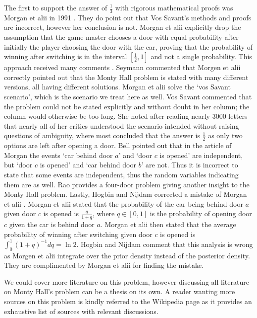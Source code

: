 \documentclass[a4paper]{report}
\theoremstyle{plain}
\theoremstyle{definition}
\theoremstyle{remark}
\numberwithin{equation}{chapter}
\DeclareMathOperator{\1}{\mathbbm{1}}
\begin{document}
The first to support the answer of $\frac{1}{3}$ with rigorous mathematical proofs was Morgan et alii in 1991 \cite{Morgan91a}. They do point out that Vos Savant's methods and proofs are incorrect, however her conclusion is not. Morgan et alii explicitly drop the assumption that the game master chooses a door with equal probability after initially the player choosing the door with the car, proving that the probability of winning after switching is in the interval $\left[\frac{1}{2},1\right]$ and not a single probability. This approach received many comments \cite{Seymann91,Morgan91b,Savant91c,Bell92,Rao92,Hogbin10}. Seymann \cite{Seymann91} commented that Morgen et alii correctly pointed out that the Monty Hall problem is stated with many different versions, all having different solutions. Morgan et alii solve the `vos Savant scenario', which is the scenario we treat here as well. Vos Savant \cite{Savant91c} commented that the problem could not be stated explicitly and without doubt in her column; the column would otherwise be too long. She noted after reading nearly 3000 letters that nearly all of her critics understood the scenario intended without raising questions of ambiguity, where most concluded that the answer is $\frac{1}{2}$ as only two options are left after opening a door. Bell \cite{Bell92} pointed out that in the article of Morgan the events `car behind door $a$' and `door $c$ is opened' are independent, but `door $c$ is opened' and `car behind door $b$' are not. Thus it is incorrect to state that some events are independent, thus the random variables indicating them are as well. Rao \cite{Rao92} provides a four-door problem giving another insight to the Monty Hall problem. Lastly, Hogbin and Nijdam \cite{Hogbin10} corrected a mistake of Morgan et alii \cite{Morgan91a}. Morgan et alii stated that the probability of the car being behind door $a$ given door $c$ is opened is $\frac{q}{1+q}$, where $q\in[0,1]$ is the probability of opening door $c$ given the car is behind door $a$. Morgan et alii then stated that the average probability of winning after switching given door $c$ is opened is $\int_0^1(1+q)^{-1}dq=\ln2$. Hogbin and Nijdam comment that this analysis is wrong as Morgen et alii integrate over the prior density instead of the posterior density. They are complimented by Morgan et alii \cite{Hogbin10} for finding the mistake.

We could cover more literature on this problem, however discussing all literature on Monty Hall's problem can be a thesis on its own. A reader wanting more sources on this problem is kindly referred to the Wikipedia page \cite{WikiMonty} as it provides an exhaustive list of sources with relevant discussions.
\end{document}
